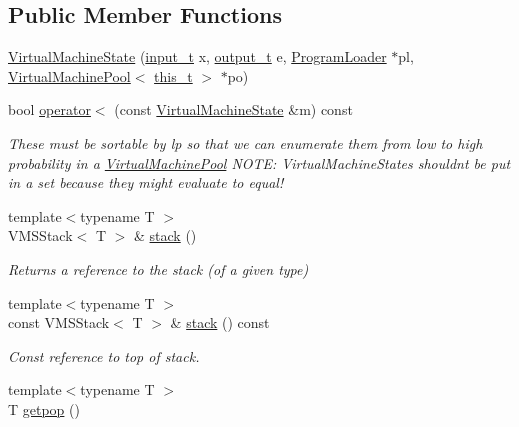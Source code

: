\subsection*{Public Member Functions}
\begin{DoxyCompactItemize}
\item 
\hyperlink{class_virtual_machine_state_a9760db87745be704f046f08369ca5eb2}{Virtual\+Machine\+State} (\hyperlink{class_virtual_machine_state_aeb5e01ec57466fd3734e0c29f2b8da0a}{input\+\_\+t} x, \hyperlink{class_virtual_machine_state_a1015cee5061f82f82ef6a953b51f9bd5}{output\+\_\+t} e, \hyperlink{class_program_loader}{Program\+Loader} $\ast$pl, \hyperlink{class_virtual_machine_pool}{Virtual\+Machine\+Pool}$<$ \hyperlink{class_virtual_machine_state_ada0e1bebef2d73581c6adcd55f8be521}{this\+\_\+t} $>$ $\ast$po)
\item 
bool \hyperlink{class_virtual_machine_state_a213400a3e616f8d1a2041491ea4c782e}{operator$<$} (const \hyperlink{class_virtual_machine_state}{Virtual\+Machine\+State} \&m) const
\begin{DoxyCompactList}\small\item\em These must be sortable by lp so that we can enumerate them from low to high probability in a \hyperlink{class_virtual_machine_pool}{Virtual\+Machine\+Pool} N\+O\+TE\+: Virtual\+Machine\+States shouldn\textquotesingle{}t be put in a set because they might evaluate to equal! \end{DoxyCompactList}\item 
{\footnotesize template$<$typename T $>$ }\\V\+M\+S\+Stack$<$ T $>$ \& \hyperlink{class_virtual_machine_state_a580428f53e64cde8aef3c0a6a79838ec}{stack} ()
\begin{DoxyCompactList}\small\item\em Returns a reference to the stack (of a given type) \end{DoxyCompactList}\item 
{\footnotesize template$<$typename T $>$ }\\const V\+M\+S\+Stack$<$ T $>$ \& \hyperlink{class_virtual_machine_state_adc77f615f164e83ee4a25f06b3a5b64d}{stack} () const
\begin{DoxyCompactList}\small\item\em Const reference to top of stack. \end{DoxyCompactList}\item 
{\footnotesize template$<$typename T $>$ }\\T \hyperlink{class_virtual_machine_state_a5c5373c434e10372d9e9a17df1532965}{getpop} ()

\end{DoxyCompactItemize}
